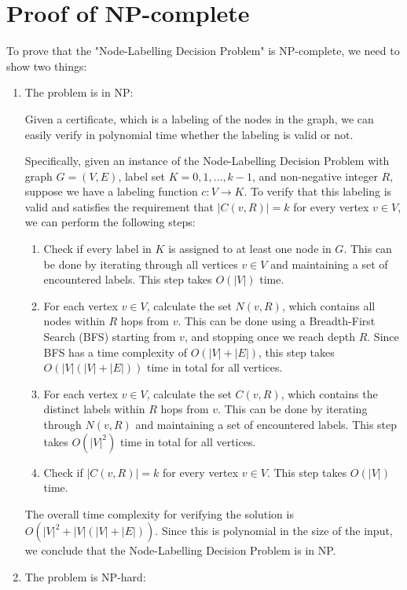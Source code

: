 \documentclass{article}
\begin{document}
\section{Proof of NP-complete}
To prove that the "Node-Labelling Decision Problem" is NP-complete, we need to show two things:
\begin{enumerate}
    \item The problem is in NP:

    Given a certificate, which is a labeling of the nodes in the graph, we can easily verify in polynomial time whether the labeling is valid or not.
    
    Specifically, given an instance of the Node-Labelling Decision Problem with graph $G=(V,E)$, label set $K={0,1,\dots,k-1}$, and non-negative integer $R$, suppose we have a labeling function $c: V \rightarrow K$. To verify that this labeling is valid and satisfies the requirement that $|C(v, R)| = k$ for every vertex $v \in V$, we can perform the following steps:
    \begin{enumerate}
        \item Check if every label in $K$ is assigned to at least one node in $G$. This can be done by iterating through all vertices $v \in V$ and maintaining a set of encountered labels. This step takes $O(|V|)$ time.

        \item For each vertex $v \in V$, calculate the set $N(v, R)$, which contains all nodes within $R$ hops from $v$. This can be done using a Breadth-First Search (BFS) starting from $v$, and stopping once we reach depth $R$. Since BFS has a time complexity of $O(|V| + |E|)$, this step takes $O(|V|(|V| + |E|))$ time in total for all vertices.

        \item For each vertex $v \in V$, calculate the set $C(v, R)$, which contains the distinct labels within $R$ hops from $v$. This can be done by iterating through $N(v, R)$ and maintaining a set of encountered labels. This step takes $O(|V|^2)$ time in total for all vertices.

        \item Check if $|C(v, R)| = k$ for every vertex $v \in V$. This step takes $O(|V|)$ time.
    \end{enumerate}
    
    The overall time complexity for verifying the solution is $O(|V|^2 + |V|(|V| + |E|))$. Since this is polynomial in the size of the input, we conclude that the Node-Labelling Decision Problem is in NP.
    \item The problem is NP-hard:


\end{enumerate}
\end{document}
